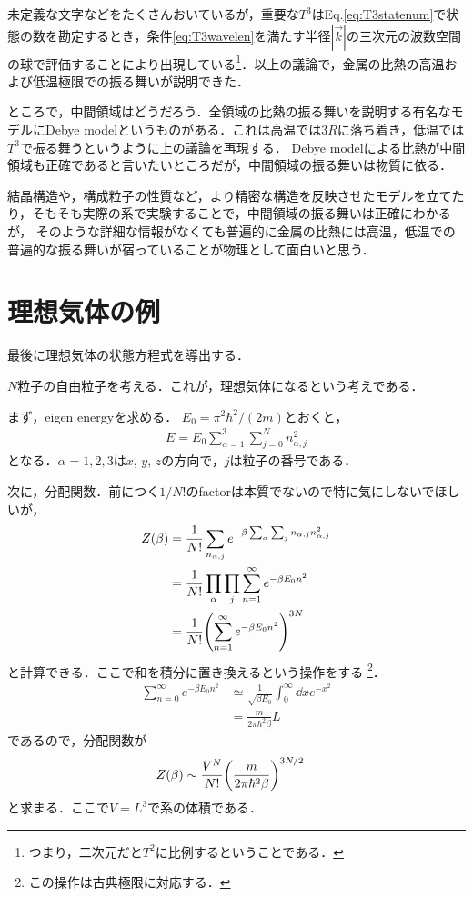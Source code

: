 \documentclass[dvipdfmx, a4paper]{jsarticle}
\theoremstyle{break}
\numberwithin{equation}{section}
\begin{document}
	未定義な文字などをたくさんおいているが，重要な$T^3$はEq.\eqref{eq:T3statenum}で状態の数を勘定するとき，条件\eqref{eq:T3wavelen}を満たす半径$|\vec{k}|$の三次元の波数空間の球で評価することにより出現している\footnote{つまり，二次元だと$T^2$に比例するということである．}．以上の議論で，金属の比熱の高温および低温極限での振る舞いが説明できた．

	ところで，中間領域はどうだろう．全領域の比熱の振る舞いを説明する有名なモデルにDebye modelというものがある．これは高温では$3R$に落ち着き，低温では$T^3$で振る舞うというように上の議論を再現する．
	Debye modelによる比熱が中間領域も正確であると言いたいところだが，中間領域の振る舞いは物質に依る．

	結晶構造や，構成粒子の性質など，より精密な構造を反映させたモデルを立てたり，そもそも実際の系で実験することで，中間領域の振る舞いは正確にわかるが，
	そのような詳細な情報がなくても普遍的に金属の比熱には高温，低温での普遍的な振る舞いが宿っていることが物理として面白いと思う．

	\section{理想気体の例}\label{sec:ideal_gas}
	最後に理想気体の状態方程式を導出する．

	
	$N$粒子の自由粒子を考える．これが，理想気体になるという考えである．

	まず，eigen energyを求める． 
	$E_0 = \pi^2 \hbar^2 / (2m)$とおくと，
	\begin{align}
			E = E_0 \sum_{\alpha = 1}^{3}\sum_{j=0}^{N}n_{\alpha, j}^2
	\end{align}
	となる．$\alpha = 1, 2, 3$は$x$, $y$, $z$の方向で，$j$は粒子の番号である．

	次に，分配関数．前につく$1/N!$のfactorは本質でないので特に気にしないでほしいが，
	\begin{align}
			Z(\beta) 
			&= \frac{1}{N!}\sum_{n_{\alpha, j}}e^{-\beta \sum_{\alpha}\sum_{j}n_{\alpha, j}n_{\alpha, j}^2}\\
			&= \frac{1}{N!}\prod_{\alpha}\prod_{j}\sum_{n=1}^{\infty}e^{-\beta E_0 n^2}\\
			&= \frac{1}{N!}\qty(\sum_{n=1}^{\infty}e^{-\beta E_0 n^2})^{3N}
	\end{align}
	と計算できる．ここで和を積分に置き換えるという操作をする
	\footnote{
		この操作は古典極限に対応する．
	}．
	\begin{align}
			\sum_{n=0}^{\infty}e^{-\beta E_0 n^2} 
			&\simeq \frac{1}{\sqrt{\beta E_0}}\int_{0}^{\infty}\dd x e^{-x^2}\\
			&= \frac{m}{2\pi\hbar^2\beta}L
	\end{align}
	であるので，分配関数が
	\begin{align}
			Z(\beta)
			&\sim \frac{V^N}{N!}\qty(\frac{m}{2\pi\hbar^2\beta})^{3N/2}
	\end{align}
	と求まる．ここで$V=L^3$で系の体積である．
\end{document}
